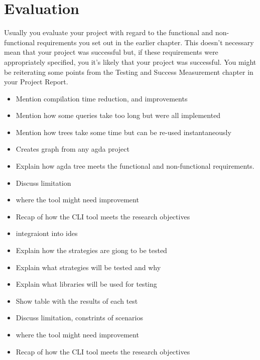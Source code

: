 
\chapter{Evaluation}

Usually you evaluate your project with regard to the functional and non-functional
requirements you set out in the earlier chapter. This doesn’t necessary mean that your project was
successful but, if these requirements were appropriately specified, you it’s likely that your project was
successful. You might be reiterating some points from the Testing and Success Measurement
chapter in your Project Report.

\begin{itemize}
\item Mention compilation time reduction, and improvements 
\item Mention how some queries take too long but were all implemented 
\item Mention how trees take some time but can be re-used instantaneously 
\item Creates graph from any agda project
\end{itemize}

\begin{itemize}
\item Explain how agda tree meets the functional and non-functional requirements.
\item Discuss limitation 
\item where the tool might need improvement 
\item Recap of how the CLI tool meets the research objectives 
\item integraiont into ides
\end{itemize}

\begin{itemize}
\item Explain how the strategies are giong to be tested 
\item Explain what strategies will be tested and why 
\item Explain what libraries will be used for testing 
\item Show table with the results of each test
\item Discuss limitation, constrints of scenarios 
\item where the tool might need improvement 
\item Recap of how the CLI tool meets the research objectives
\end{itemize}

